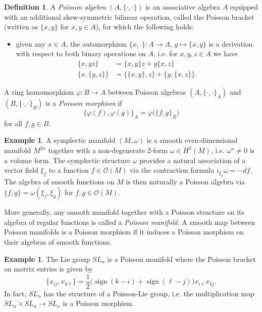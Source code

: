 \documentclass{amsart}
\theoremstyle{definition}
\newtheorem{definition}[theorem]{Definition}
\newtheorem{example}[theorem]{Example}
\theoremstyle{remark}
\numberwithin{equation}{section}
\newcommand{\cO}{{\mathcal{O}}}
\newcommand{\sgn}{\operatorname{sign}}
\begin{document}
  \begin{definition}
    A \emph{Poisson algebra} $(A,\{\cdot,\cdot\})$ is an associative algebra $A$ equipped with an additional skew-symmetric bilinear operation, called the Poisson bracket (written as $\{x,y\}$ for $x,y\in A$), for which the following holds:
    \begin{itemize}
      \item given any $x\in A$, the automorphism $\{x,\cdot\}:A\to A$, $y\mapsto\{x,y\}$ is a derivation with respect to both binary operations on $A$, i.e. for $x,y,z\in A$ we have
      \begin{align*}
        \tag{Leibnitz rule} \{x,yz\}&=\{x,y\}z+y\{x,z\}\\
        \tag{Jacobi identity}\{x,\{y,z\}\}&=\{\{x,y\},z\}+\{y,\{x,z\}\}.
      \end{align*}
    \end{itemize}
    A ring homomorphism $\varphi:B\to A$ between Poisson algebras $(A,\{\cdot,\cdot\}_A)$ and $(B,\{\cdot,\cdot\}_B)$ is a \emph{Poisson morphism} if
    \[\{\varphi(f),\varphi(g)\}_A=\varphi\big(\{f,g\}_B\big)\]
    for all $f,g\in B$.
  \end{definition}

  \begin{example}
    A symplectic manifold $(M,\omega)$ is a smooth even-dimensional manifold $M^{2n}$ together with a non-degenerate 2-form $\omega\in H^2(M)$, i.e. $\omega^n\ne0$ is a volume form.  The symplectic structure $\omega$ provides a natural association of a vector field $\xi_f$ to a function $f\in\cO(M)$ via the contraction formula $\iota_{\xi_f}\omega=-df$.  The algebra of smooth functions on $M$ is then naturally a Poisson algebra via $\{f,g\}=\omega(\xi_f,\xi_g)$ for $f,g\in\cO(M)$.
  \end{example}
  More generally, any smooth manifold together with a Poisson structure on its algebra of regular functions is called a \emph{Poisson manifold}.  A smooth map between Poisson manifolds is a Poisson morphism if it induces a Poisson morphism on their algebras of smooth functions.  
  \begin{example}
    The Lie group $SL_n$ is a Poisson manifold where the Poisson bracket on matrix entries is given by
    \begin{equation}
      \{x_{ij},x_{k\ell}\}=\frac{1}{2}\big(\sgn(k-i)+\sgn(\ell-j)\big)x_{i\ell}x_{kj}.
    \end{equation}
    In fact, $SL_n$ has the structure of a Poisson-Lie group, i.e. the multiplication map $SL_n\times SL_n\to SL_n$ is a Poisson morphism.
  \end{example}
\end{document}
